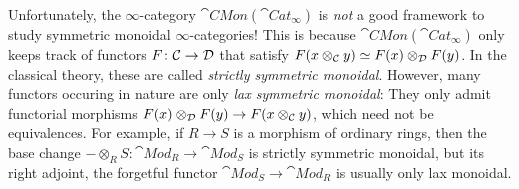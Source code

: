 Unfortunately, the $\infty$-category $\cat{CMon}(\cat{Cat}_\infty)$ is \emph{not} a good framework to study symmetric monoidal $\infty$-categories! This is because $\cat{CMon}(\cat{Cat}_\infty)$ only keeps track of functors $F\colon \mathcal{C}\rightarrow \mathcal{D}$ that satisfy $F(x\otimes_{\mathcal{C}} y)\simeq F(x)\otimes_{\mathcal{D}} F(y)$. In the classical theory, these are called \emph{strictly symmetric monoidal}. However, many functors occuring in nature are only \emph{lax symmetric monoidal}: They only admit functorial morphisms $F(x)\otimes_{\mathcal{D}} F(y)\rightarrow F(x\otimes_{\mathcal{C}} y)$, which need not be equivalences. For example, if $R\rightarrow S$ is a morphism of ordinary rings, then the base change $-\otimes_RS\colon \cat{Mod}_R\rightarrow \cat{Mod}_S$ is strictly symmetric monoidal, but its right adjoint, the forgetful functor $\cat{Mod}_S\rightarrow \cat{Mod}_R$ is usually only lax monoidal.

